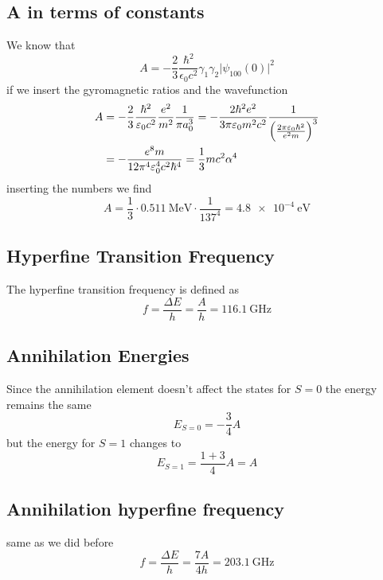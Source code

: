\subsection{A in terms of constants}
We know that
\begin{equation}
    A = -\frac{2}{3}\frac{\hbar^2}{\epsilon_0 c^2}\gamma_1 \gamma_2 \lvert\psi_{100}(0)\rvert^2
\end{equation}
if we insert the gyromagnetic ratios and the wavefunction
\begin{align}
    A &= -\frac{2}{3}\frac{\hbar^2}{\varepsilon_0 c^2}\frac{e^2}{m^2}\frac{1}{\pi a_0^3} = -\frac{2\hbar^2 e^2}{3\pi\varepsilon_0 m^2 c^2}\frac{1}{\left(\frac{2\pi\varepsilon_0 \hbar^2}{e^2 m} \right)^3} \\
    &= -\frac{e^8 m }{12\pi^4\varepsilon_0^4 c^2 \hbar^4} = \frac{1}{3}mc^2 \alpha^4
\end{align}
inserting the numbers we find
\begin{equation}
    A = \frac{1}{3}\cdot\qty{0.511}{\mega\electronvolt}\cdot \frac{1}{137^4} = \qty{4.8e-4}{\electronvolt}
\end{equation}
\subsection{Hyperfine Transition Frequency}
The hyperfine transition frequency is defined as
\begin{equation}
    f = \frac{\Delta E}{h} = \frac{A}{h} = \qty{116.1}{\giga\hertz}
\end{equation}
\subsection{Annihilation Energies}
Since the annihilation element doesn't affect the states for \(S=0\) the energy remains the same
\begin{equation}
    E_{S=0} = -\frac{3}{4}A
\end{equation}
but the energy for \(S=1\) changes to
\begin{equation}
    E_{S=1} = \frac{1+3}{4}A = A
\end{equation}
\subsection{Annihilation hyperfine frequency}
same as we did before
\begin{equation}
    f = \frac{\Delta E}{h} = \frac{7A}{4h} = \qty{203.1}{\giga\hertz}
\end{equation}